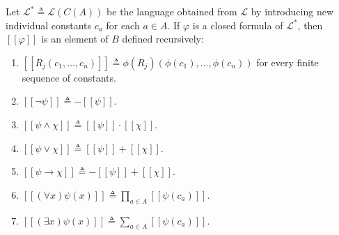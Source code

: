 Let $\mathcal{L}^* \triangleq \mathcal{L}(C(A))$ be the language obtained from $\mathcal{L}$ by introducing new individual constants $c_a$ for each $a \in A$. If $\varphi$ is a closed formula of $\mathcal{L}^*$, then $[\![\varphi]\!]$ is an element of $B$ defined recursively:
\begin{enumerate}
\item $[\![R_j(c_1, \ldots, c_n)]\!] \triangleq \phi(R_j)(\phi(c_1), \ldots, \phi(c_n))$ for every finite sequence of constants.
\item $[\![\neg \psi]\!] \triangleq -[\![\psi]\!]$.
\item $[\![\psi \land \chi]\!] \triangleq [\![\psi]\!] \cdot [\![\chi]\!]$.
\item $[\![\psi \lor \chi]\!] \triangleq [\![\psi]\!] + [\![\chi]\!]$.
\item $[\![\psi \rightarrow \chi]\!] \triangleq -[\![\psi]\!] + [\![\chi]\!]$.
\item $[\![(\forall x) \psi(x)]\!] \triangleq \prod_{a \in A} [\![\psi(c_a)]\!]$.
\item $[\![(\exists x) \psi(x)]\!] \triangleq \sum_{a \in A} [\![\psi(c_a)]\!]$.
\end{enumerate}
